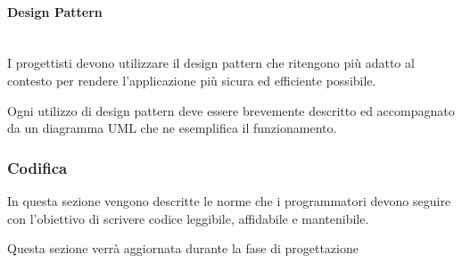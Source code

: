 \paragraph{Design Pattern}\mbox{}\\
I progettisti devono utilizzare il design pattern che ritengono più adatto al contesto per rendere l'applicazione più sicura ed efficiente possibile.

Ogni utilizzo di design pattern deve essere brevemente descritto ed accompagnato da un diagramma UML che ne esemplifica il funzionamento.

\subsubsection{Codifica}
In questa sezione vengono descritte le norme che i programmatori devono seguire con l'obiettivo di scrivere codice leggibile, affidabile e mantenibile.

Questa sezione verrà aggiornata durante la fase di progettazione

